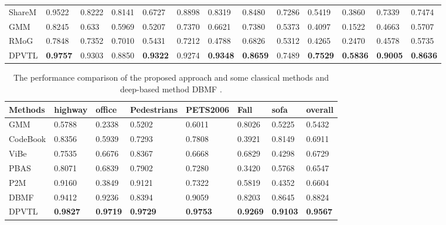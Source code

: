 \documentclass[journal]{IEEEtran}
\begin{document}
\begin{table}[!t]
\begin{tabular}{lllllllllllll}
ShareM\cite{2015_ICME_ShareModel}      & 0.9522   & 0.8222  & 0.8141     & 0.6727    & 0.8898 & 0.8319  & 0.8480   & 0.7286     & 0.5419     & 0.3860 & 0.7339  & 0.7474  \\
GMM\cite{Zivkovic2004}         & 0.8245   & 0.633   & 0.5969     & 0.5207    & 0.7370 & 0.6621  & 0.7380   & 0.5373     & 0.4097     & 0.1522 & 0.4663  & 0.5707  \\
RMoG\cite{Varadarajan2013}        & 0.7848   & 0.7352  & 0.7010     & 0.5431    & 0.7212 & 0.4788  & 0.6826   & 0.5312     & 0.4265     & 0.2470 & 0.4578  & 0.5735  \\ \hline
DPVTL        & \textbf{0.9757}   & 0.9303  & 0.8850     & \textbf{0.9322}    & 0.9274 & \textbf{0.9348}  & \textbf{0.8659}   & 0.7489     & \textbf{0.7529}     & \textbf{0.5836} & \textbf{0.9005}  & \textbf{0.8636} \\ \hline
\end{tabular}
\end{table}

\begin{table}[!t]
\centering
\caption{The performance comparison of the proposed approach and some classical methods and deep-based method DBMF .}
\label{tab2}
\begin{tabular}{llllllll}
\hline
Methods  & highway & office & Pedestrians & PETS2006 & Fall   & sofa   & overall \\ \hline
GMM\cite{Stauffer1999}      & 0.5788  & 0.2338 & 0.5202      & 0.6011   & 0.8026 & 0.5225 & 0.5432  \\
CodeBook\cite{WU2010739} & 0.8356  & 0.5939 & 0.7293      & 0.7808   & 0.3921 & 0.8149 & 0.6911  \\
ViBe\cite{Barnich2011_2011_TIP}     & 0.7535  & 0.6676 & 0.8367      & 0.6668   & 0.6829 & 0.4298 & 0.6729  \\
PBAS\cite{Hofmann2012Background}     & 0.8071  & 0.6839 & 0.7902      & 0.7280   & 0.3420 & 0.5768 & 0.6547  \\
P2M\cite{Yang2016P2M}      & 0.9160  & 0.3849 & 0.9121      & 0.7322   & 0.5819 & 0.4352 & 0.6604  \\
DBMF\cite{Yang2018DBMF}     & 0.9412  & 0.9236 & 0.8394      & 0.9059   & 0.8203 & 0.8645 & 0.8824  \\ \hline
DPVTL     & \textbf{0.9827}  & \textbf{0.9719} & \textbf{0.9729}      & \textbf{0.9753}   & \textbf{0.9269} & \textbf{0.9103} & \textbf{0.9567}  \\ \hline
\end{tabular}
\end{table}
\end{document}
